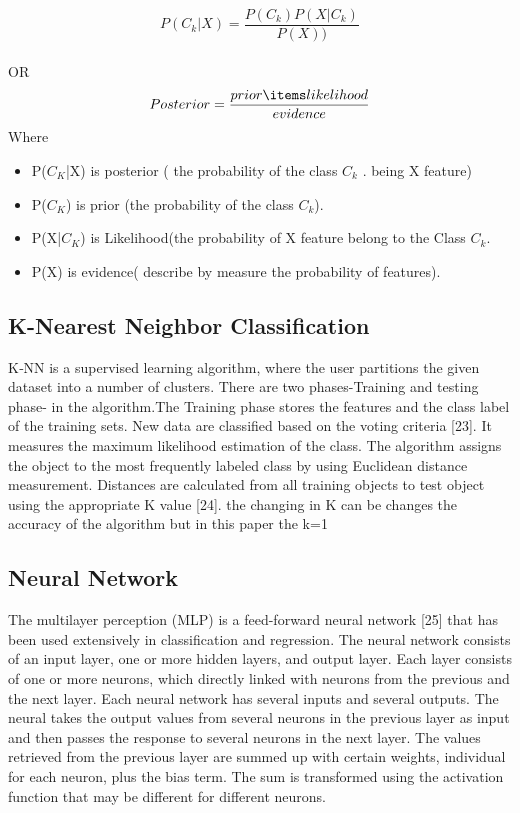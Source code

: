 \documentclass[twoside]{article}
\begin{document}
\begin{multicols}{2}
\begin{equation}
\label{Bayes' theorem}
P(C_{k}|X)=\frac{P(C_{k})P(X|C_{k})}{P(X))}
\end{equation}
\\OR\\
\begin{equation}
\label{Bayes' theorem1}
Posterior=\frac{prior\items likelihood}{evidence}
\end{equation}
Where
\begin{itemize}
\item P($C_K$|X) is posterior ( the probability of the class $C_k$ . being X feature)
\item P($C_K$) is prior (the probability of the class $C_k$).
\item P(X|$C_K$) is Likelihood(the probability of X feature belong to the Class $C_k$.
\item P(X) is evidence( describe by measure the probability of features).
\end{itemize}

\subsection*{K-Nearest Neighbor Classification}
K‐NN is a supervised learning algorithm, where the user partitions the given dataset into a number of clusters. There are two phases-Training and testing phase- in the algorithm.The Training phase stores the features and the class label of the training sets. New data are classified based on the voting criteria [23].  It measures the maximum likelihood estimation of the class. The algorithm assigns the object to the most frequently labeled class by using Euclidean distance measurement. Distances are calculated from all training objects to test object using the appropriate K value [24]. the changing in K can be changes the accuracy of the algorithm but in this paper the k=1

\subsection*{Neural Network}
The multilayer perception (MLP) is a feed-forward neural network [25] that has been used extensively in classification and regression. The neural network consists of an input layer, one or more hidden layers, and output layer. Each layer consists of one or more neurons, which directly linked with neurons from the previous and the next layer. Each neural network has several inputs and several outputs. The neural takes the output values from several neurons in the previous layer as input and then passes the response to several neurons in the next layer. The values retrieved from the previous layer are summed up with certain weights, individual for each neuron, plus the bias term. The sum is transformed using the activation function that may be different for different neurons. 


\end{multicols}
\end{document}
